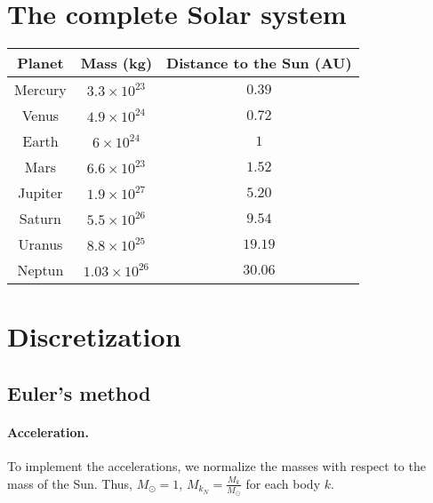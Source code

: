 \documentclass[a4paper, twoside, 11pt]{report}
\theoremstyle{theorem}
\theoremstyle{remark}
\theoremstyle{exemple}
\begin{document}
    \section{The complete Solar system}
    
        \begin{center}
            \begin{tabular}{|c|cc|}
                \hline
                Planet & Mass (kg) & Distance to the Sun (AU) \\
                \hline \hline
                Mercury & $3.3 \times 10^{23}$ & $0.39$ \\
                \hline
                Venus & $4.9 \times 10^{24}$ & $0.72$ \\
                \hline
                Earth & $6 \times 10^{24}$ & $1$ \\
                \hline 
                Mars & $6.6 \times 10^{23}$ & $1.52$ \\
                \hline
                Jupiter & $1.9 \times 10^{27}$ & $5.20$ \\
                \hline
                Saturn & $5.5 \times 10^{26}$ & $9.54$ \\
                \hline
                Uranus & $8.8 \times 10^{25}$ & $19.19$ \\
                \hline
                Neptun & $1.03 \times 10^{26}$ & $30.06$ \\
                \hline                
            \end{tabular}
        \end{center}

    \section{Discretization}
        \subsection{Euler's method}
            \paragraph{Acceleration.}To implement the accelerations, we normalize the masses with respect to the mass of the Sun. Thus, $M_{\odot}=1$, $M_{k_N}=\frac{M_k}{M_{\odot}}$ for each body $k$.
\end{document}
